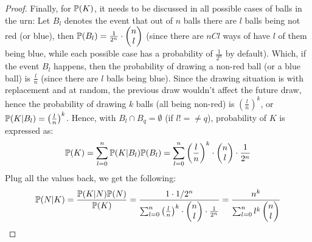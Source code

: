 \documentclass{article}
\begin{document}
\begin{proof}
    Finally, for $\mathbb{P}(K)$, it needs to be discussed in all possible cases of balls in the urn: Let $B_{l}$ denotes the event that out of $n$ balls there are $l$ balls being not red (or blue), then $\mathbb{P}(B_l)=\frac{1}{2^n}\cdot\begin{pmatrix}n\\l\end{pmatrix}$ (since there are $nCl$ ways of have $l$ of them being blue, while each possible case has a probability of $\frac{1}{2^n}$ by default). Which, if the event $B_l$ happens, then the probability of drawing a non-red ball (or a blue ball) is $\frac{l}{n}$ (since there are $l$ balls being blue). Since the drawing situation is with replacement and at random, the previous draw wouldn't affect the future draw, hence the probability of drawing $k$ balls (all being non-red) is $\left(\frac{l}{n}\right)^k$, or $\mathbb{P}(K|B_l)=\left(\frac{l}{n}\right)^k$. Hence, with $B_l \cap B_q=\emptyset$ (if $l!=\neq q$), probability of $K$ is expressed as:
    \begin{align}
        \mathbb{P}(K)=\sum_{l=0}^{n}\mathbb{P}(K|B_l)\mathbb{P}(B_l) = \sum_{l=0}^{n}\left(\frac{l}{n}\right)^k\cdot\begin{pmatrix}n\\l\end{pmatrix}\cdot\frac{1}{2^n}
    \end{align}
    Plug all the values back, we get the following:
    \begin{align}
        \mathbb{P}(N|K) =\frac{\mathbb{P}(K|N)\mathbb{P}(N)}{\mathbb{P}(K)}= \frac{1\cdot 1/2^n}{\sum_{l=0}^{n}\left(\frac{l}{n}\right)^k\cdot\begin{pmatrix}n\\l\end{pmatrix}\cdot\frac{1}{2^n}} = \frac{n^k}{\sum_{l=0}^{n}l^k\begin{pmatrix}n\\l\end{pmatrix}}
    \end{align}
\end{proof}

\newpage
\end{document}
